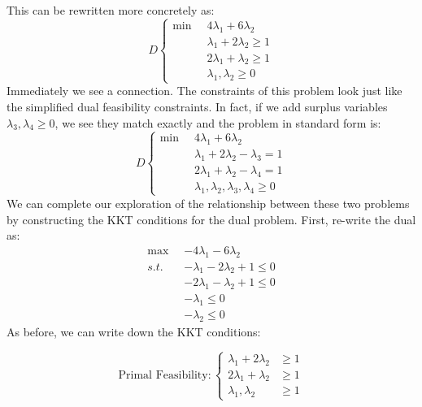 This can be rewritten more concretely as:
\begin{equation}
D\left\{
\begin{aligned}
\min \;\; & 4\lambda_1 + 6\lambda_2\\
&\lambda_1 + 2\lambda_2 \geq 1\\
&2\lambda_1 + \lambda_2 \geq 1\\
& \lambda_1, \lambda_2 \geq 0
\end{aligned}
\right.
\end{equation}
Immediately we see a connection. The constraints of this problem look just like the simplified dual feasibility constraints. In fact, if we add surplus variables $\lambda_3, \lambda_4 \geq 0$, we see they match exactly and the problem in standard form is:
\begin{equation}
D\left\{
\begin{aligned}
\min \;\; & 4\lambda_1 + 6\lambda_2\\
&\lambda_1 + 2\lambda_2 - \lambda_3 = 1\\
&2\lambda_1 + \lambda_2 -\lambda_4 =1\\
& \lambda_1, \lambda_2,\lambda_3, \lambda_4 \geq 0
\end{aligned}
\right.
\end{equation}
We can complete our exploration of the relationship between these two problems by constructing the KKT conditions for the dual problem. First, re-write the dual as:
\begin{equation}
\begin{aligned}
\max\;\; & -4\lambda_1 - 6\lambda_2 \\
s.t. & -\lambda_1 - 2\lambda_2 + 1\leq 0\\
& -2\lambda_1 - \lambda_2 + 1\leq 0\\
& -\lambda_1 \leq 0\\
& -\lambda_2 \leq 0
\end{aligned}
\end{equation}
As before, we can write down the KKT conditions:

\begin{equation}\text{Primal Feasibility}: \left\{
\begin{aligned}
\lambda_1 + 2\lambda_2 &\geq 1\\
2\lambda_1 + \lambda_2 &\geq 1\\
\lambda_1, \lambda_2 & \geq 1
\end{aligned}
\right.\end{equation}


